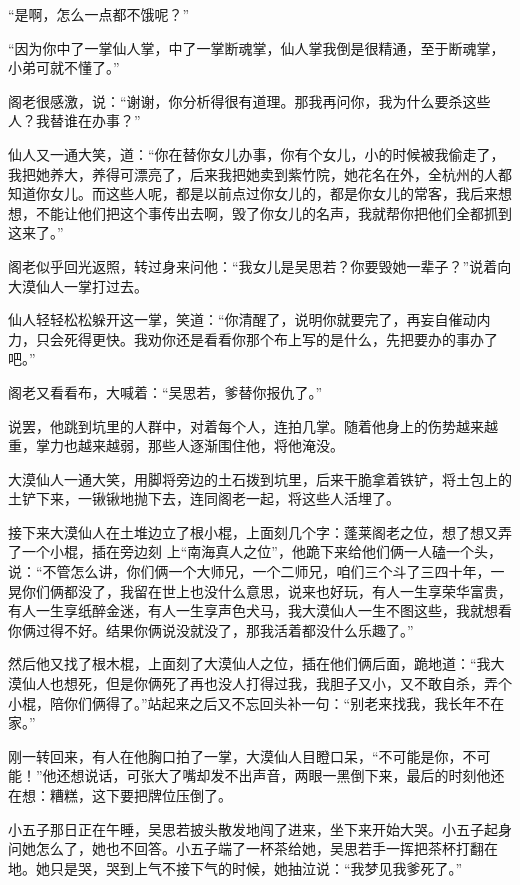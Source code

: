 “是啊，怎么一点都不饿呢？”

“因为你中了一掌仙人掌，中了一掌断魂掌，仙人掌我倒是很精通，至于断魂掌，小弟可就不懂了。”

阁老很感激，说：“谢谢，你分析得很有道理。那我再问你，我为什么要杀这些人？我替谁在办事？”

仙人又一通大笑，道：“你在替你女儿办事，你有个女儿，小的时候被我偷走了，我把她养大，养得可漂亮了，后来我把她卖到紫竹院，她花名在外，全杭州的人都知道你女儿。而这些人呢，都是以前点过你女儿的，都是你女儿的常客，我后来想想，不能让他们把这个事传出去啊，毁了你女儿的名声，我就帮你把他们全都抓到这来了。”

阁老似乎回光返照，转过身来问他：“我女儿是吴思若？你要毁她一辈子？”说着向大漠仙人一掌打过去。

仙人轻轻松松躲开这一掌，笑道：“你清醒了，说明你就要完了，再妄自催动内力，只会死得更快。我劝你还是看看你那个布上写的是什么，先把要办的事办了吧。”

阁老又看看布，大喊着：“吴思若，爹替你报仇了。”

说罢，他跳到坑里的人群中，对着每个人，连拍几掌。随着他身上的伤势越来越重，掌力也越来越弱，那些人逐渐围住他，将他淹没。

大漠仙人一通大笑，用脚将旁边的土石拨到坑里，后来干脆拿着铁铲，将土包上的土铲下来，一锹锹地抛下去，连同阁老一起，将这些人活埋了。

接下来大漠仙人在土堆边立了根小棍，上面刻几个字：蓬莱阁老之位，想了想又弄了一个小棍，插在旁边刻
上“南海真人之位”，他跪下来给他们俩一人磕一个头，说：“不管怎么讲，你们俩一个大师兄，一个二师兄，咱们三个斗了三四十年，一晃你们俩都没了，我留在世上也没什么意思，说来也好玩，有人一生享荣华富贵，有人一生享纸醉金迷，有人一生享声色犬马，我大漠仙人一生不图这些，我就想看你俩过得不好。结果你俩说没就没了，那我活着都没什么乐趣了。”

然后他又找了根木棍，上面刻了大漠仙人之位，插在他们俩后面，跪地道：“我大漠仙人也想死，但是你俩死了再也没人打得过我，我胆子又小，又不敢自杀，弄个小棍，陪你们俩得了。”站起来之后又不忘回头补一句：“别老来找我，我长年不在家。”

刚一转回来，有人在他胸口拍了一掌，大漠仙人目瞪口呆，“不可能是你，不可能！”他还想说话，可张大了嘴却发不出声音，两眼一黑倒下来，最后的时刻他还在想：糟糕，这下要把牌位压倒了。
\newline

小五子那日正在午睡，吴思若披头散发地闯了进来，坐下来开始大哭。小五子起身问她怎么了，她也不回答。小五子端了一杯茶给她，吴思若手一挥把茶杯打翻在地。她只是哭，哭到上气不接下气的时候，她抽泣说：“我梦见我爹死了。”

